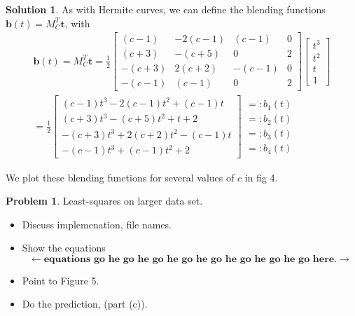 \documentclass[10pt]{article}
\theoremstyle{plain}
\theoremstyle{definition}
\newtheorem{prob}{Problem}
\newtheorem*{soln*}{Solution}
\numberwithin{equation}{section}
\begin{document}
\begin{soln*}
    As with Hermite curves, we can define the blending functions
    $\bm{b}(t) = M_C^T \bm{t}$, with
    \begin{align*}
    \bm{b}(t) = M_C^T \bm{t}
              = 
            \frac{1}{2} \begin{bmatrix}
                (c-1)   & -2(c-1)   & (c-1)     & 0         \\
                (c+3)   & -(c+5)    & 0         & 2         \\
                -(c+3)  & 2(c+2)    & -(c-1)    & 0         \\
                -(c-1)  & (c-1)     & 0         & 2
            \end{bmatrix}
    \begin{bmatrix} t^3 \\ t^2 \\ t \\ 1 \end{bmatrix} \\
          =  \frac{1}{2} \begin{bmatrix}
              (c-1)   t^3 -2(c-1) t^2  + (c-1)  t \\ 
              (c+3)   t^3 -(c+5)  t^2    +     t   + 2         \\
              -(c+3)  t^3 + 2(c+2)  t^2  -(c-1) t  \\ 
              -(c-1)  t^3 + (c-1)   t^2  + 2
            \end{bmatrix}
            \begin{matrix}
                =: b_1(t) \\
                =: b_2(t) \\
                =: b_3(t) \\
                =: b_4(t) 
            \end{matrix}
    \end{align*}

We plot these blending functions for several values of $c$ in fig 4.
\end{soln*}
\begin{prob} Least-squares on larger data set.

    \begin{itemize}
    \item Discuss implemenation, file names.
    \item Show the equations
        \[
            \leftarrow \textbf{equations go he go he go he go he go he go he go he go here}. \rightarrow
        \]
    \item Point to Figure 5.
    \item Do the prediction, (part (c)).
    \end{itemize}

\end{prob}
\end{document}
